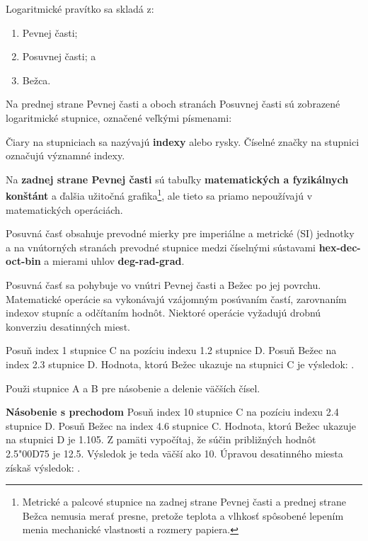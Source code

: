   \begin{multicols*}{3}
  \normalsize{
  Logaritmické pravítko sa skladá z:
    \begin{enumerate}
      \setlength{\parskip}{0pt}
      \setlength{\parsep}{0pt}
      \item Pevnej časti;
      \item Posuvnej časti; a
      \item Bežca.
    \end{enumerate}

  Na prednej strane Pevnej časti a oboch stranách Posuvnej časti sú zobrazené logaritmické stupnice, označené veľkými písmenami:

  
  Čiary na stupniciach sa nazývajú \textbf{indexy} alebo rysky. Číselné značky na stupnici označujú významné indexy.

  Na \textbf{zadnej strane Pevnej časti} sú tabuľky \textbf{matematických a fyzikálnych konštánt} a ďalšia užitočná grafika\footnote{Metrické a palcové stupnice na zadnej strane Pevnej časti a prednej strane Bežca nemusia merať presne, pretože teplota a vlhkosť spôsobené lepením menia mechanické vlastnosti a rozmery papiera.}, ale tieto sa priamo nepoužívajú v matematických operáciách.

Posuvná časť  obsahuje prevodné mierky pre imperiálne a metrické (SI) jednotky a na vnútorných stranách prevodné stupnice medzi číselnými sústavami \textbf{hex-dec-oct-bin} a mierami uhlov \textbf{deg-rad-grad}.

  Posuvná časť sa pohybuje vo vnútri Pevnej časti a Bežec po jej povrchu. Matematické operácie sa vykonávajú vzájomným posúvaním častí, zarovnaním indexov stupníc a odčítaním hodnôt. Niektoré operácie vyžadujú drobnú konverziu desatinných miest.

  


Posuň index 1 stupnice C na pozíciu indexu 1.2 stupnice D.
Posuň Bežec na index 2.3 stupnice D.
Hodnota, ktorú Bežec ukazuje na stupnici C je výsledok: .

\footnotesize Použi stupnice A a B pre násobenie a delenie väčších čísel.\normalsize

  \textbf{Násobenie s prechodom}
Posuň index 10 stupnice C na pozíciu indexu 2.4 stupnice D.
Posuň Bežec na index 4.6 stupnice C.
Hodnota, ktorú Bežec ukazuje na stupnici D je 1.105.
Z pamäti vypočítaj, že súčin približných hodnôt 2.5{\char"00D7}5 je 12.5.
Výsledok je teda väčší ako 10.
Úpravou desatinného miesta získaš výsledok: . 

}
\end{multicols*}
